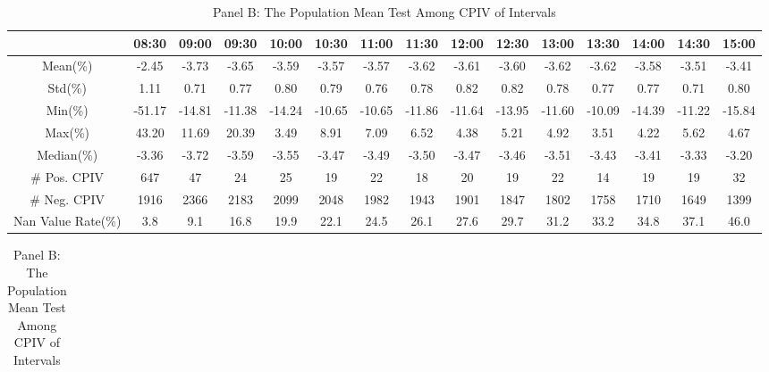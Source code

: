 \begin{table}[h]
\begin{threeparttable}
\begin{subtable}[t]{\linewidth}
\begin{tabular}{ccccccccccccccc}
\toprule
\textbf{}        & 08:30 & 09:00 & 09:30 & 10:00 & 10:30 & 11:00 & 11:30 & 12:00 & 12:30 & 13:00 & 13:30 & 14:00 & 14:30 & 15:00 \\ \midrule
Mean(\%)         & -2.45 & -3.73 & -3.65 & -3.59 & -3.57 & -3.57 & -3.62 & -3.61 & -3.60 & -3.62 & -3.62 & -3.58 & -3.51 & -3.41 \\
Std(\%)          & 1.11  & 0.71  & 0.77  & 0.80  & 0.79  & 0.76  & 0.78  & 0.82  & 0.82  & 0.78  & 0.77  & 0.77  & 0.71  & 0.80  \\
Min(\%)          & -51.17 & -14.81 & -11.38 & -14.24 & -10.65 & -10.65 & -11.86 & -11.64 & -13.95 & -11.60 & -10.09 & -14.39 & -11.22 & -15.84 \\
Max(\%)          & 43.20  & 11.69  & 20.39  & 3.49   & 8.91   & 7.09   & 6.52   & 4.38   & 5.21   & 4.92   & 3.51   & 4.22   & 5.62   & 4.67   \\
Median(\%)       & -3.36  & -3.72  & -3.59  & -3.55  & -3.47  & -3.49  & -3.50  & -3.47  & -3.46  & -3.51  & -3.43  & -3.41  & -3.33  & -3.20  \\
\# Pos. CPIV     & 647   & 47    & 24    & 25    & 19    & 22    & 18    & 20    & 19    & 22    & 14    & 19    & 19    & 32    \\
\# Neg. CPIV     & 1916  & 2366  & 2183  & 2099  & 2048  & 1982  & 1943  & 1901  & 1847  & 1802  & 1758  & 1710  & 1649  & 1399  \\
Nan Value Rate(\%) & 3.8   & 9.1   & 16.8  & 19.9  & 22.1  & 24.5  & 26.1  & 27.6  & 29.7  & 31.2  & 33.2  & 34.8  & 37.1  & 46.0  \\ \bottomrule
\end{tabular}
\end{subtable}

\medskip

\begin{subtable}[t]{\linewidth}

\caption{Panel B: The Population Mean Test Among CPIV of Intervals}
\footnotesize

\begin{tabular}{|c|cccccccccccccc}
\toprule


\end{tabular}
\end{subtable}
\end{threeparttable}
\end{table}
